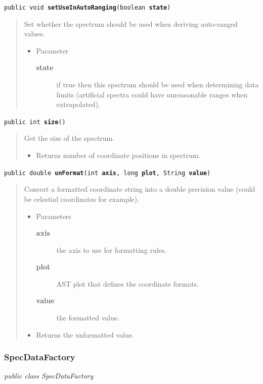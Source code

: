 \documentclass[twoside,11pt]{article}
\renewcommand{\_}{\texttt{\symbol{95}}}
\newcommand{\startsection}[4]{
   \subsubsection{\label{#3}{#2}}
   #4
}
\newcommand{\method}[1]{\texttt{#1}}
\newenvironment{desc}{\begin{quote}}{\end{quote}}
\begin{document}
\method{public void \textbf{setUseInAutoRanging}(\texttt{boolean} \textbf{state})\label{l117}\label{l118}}
\begin{desc}Set whether the spectrum should be used when deriving
 auto-ranged values.
\begin{itemize}
\item{Parameter
  \begin{description}
   \item[\textbf{state}]{if true then this spectrum should be used when
             determining data limits (artificial spectra could
             have unreasonable ranges when extrapolated).}
  \end{description}}
\end{itemize}
\end{desc}

\method{public int \textbf{size}()\label{l119}\label{l120}}
\begin{desc}Get the size of the spectrum.
\begin{itemize}
\item{Returns number of coordinate positions in spectrum. }
\end{itemize}
\end{desc}

\method{public double \textbf{unFormat}(\texttt{int} \textbf{axis}, \texttt{long} \textbf{plot}, \texttt{String} \textbf{value})\label{l121}\label{l122}}
\begin{desc}Convert a formatted coordinate string into a double precision
 value (could be celestial coordinates for example).
\begin{itemize}
\item{Parameters
  \begin{description}
   \item[\textbf{axis}]{the axis to use for formatting rules.}
   \item[\textbf{plot}]{AST plot that defines the coordinate formats.}
   \item[\textbf{value}]{the formatted value.}
  \end{description}}
\end{itemize}
\begin{itemize}
\item{Returns the unformatted value. }
\end{itemize}
\end{desc}

\startsection{Class}{SpecDataFactory}{l2}

\fbox{\parbox{\textwidth}{
\textit{public
 class SpecDataFactory}
}} %
\end{document}
